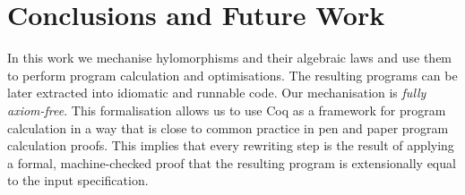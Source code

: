 \documentclass[a4paper,UKenglish,cleveref, autoref, thm-restate]{lipics-v2021}
\newcommand{\haskell}[1]{\texttt{#1}}
\begin{document}



\section{Conclusions and Future Work}
In this work we mechanise hylomorphisms and their algebraic laws and use them to
perform program calculation and optimisations. The resulting programs can be
later extracted into idiomatic and runnable code. Our mechanisation is
\emph{fully axiom-free}. This formalisation allows us to use Coq as a framework
for program calculation in a way that is close to common practice in pen and
paper program calculation proofs. This implies that every rewriting step is the
result of applying a formal, machine-checked proof that the resulting program is
extensionally equal to the input specification.
\end{document}
